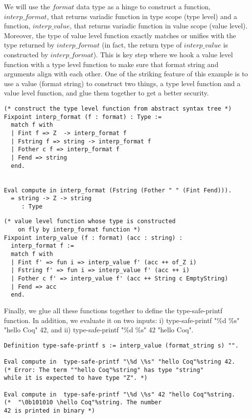 \noindent
We will use the $format$ data type as a hinge to construct a 
function, $interp\_format$, that returns variadic function in type scope (type level)
and a function, $interp\_value$,  that returns  variadic function in value scope (value level).
Moreover, the type of value level function   
exactly matches or unifies with the type returned by $interp\_format$ 
(in fact, the return type of $interp\_value$ is constructed by $interp\_format$).
This 
is key step where we hook a value level function with a type level function to 
make sure that format string and arguments align with each other.  One of 
the striking feature of this example is to use a value (format string) to 
construct two things,  a type level function and a value level function, 
and glue them together to get a better security.


\begin{verbatim}
(* construct the type level function from abstract syntax tree *)
Fixpoint interp_format (f : format) : Type :=
  match f with
  | Fint f => Z  -> interp_format f
  | Fstring f => string -> interp_format f
  | Fother c f => interp_format f
  | Fend => string
  end.
  

Eval compute in interp_format (Fstring (Fother " " (Fint Fend))). 
  = string -> Z -> string
     : Type 
\end{verbatim}


\begin{verbatim}
(* value level function whose type is constructed 
    on fly by interp_format function *)
Fixpoint interp_value (f : format) (acc : string) : 
  interp_format f :=
  match f with
  | Fint f' => fun i => interp_value f' (acc ++ of_Z i)
  | Fstring f' => fun i => interp_value f' (acc ++ i)
  | Fother c f' => interp_value f' (acc ++ String c EmptyString)
  | Fend => acc
  end.
\end{verbatim}

\noindent
Finally, we glue all these functions together to define the type-safe-printf function.  In addition,  we evaluate it on two inputs: 
i)  type-safe-printf "\%d \%s" "hello Coq" 42, and ii)  type-safe-printf "\%d \%s" 42 "hello Coq".

\begin{verbatim}
Definition type-safe-printf s := interp_value (format_string s) "".           

Eval compute in  type-safe-printf "\%d \%s" "hello Coq"%string 42.
(* Error: The term ""hello Coq"%string" has type "string" 
while it is expected to have type "Z". *)

Eval compute in  type-safe-printf "\%d \%s" 42 "hello Coq"%string. 
(*  "\0b101010 \hello Coq"%string. The number 
42 is printed in binary *)                            
\end{verbatim}


